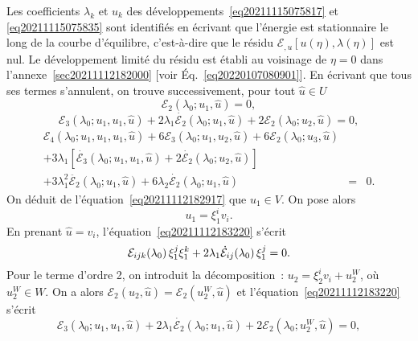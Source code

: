 \documentclass[12pt, final]{amsart}
\begin{document}
Les coefficients $\lambda_k$ et $u_k$ des
développements~\eqref{eq20211115075817} et \eqref{eq20211115075835} sont
identifiés en écrivant que l'énergie est stationnaire le long de
la courbe d'équilibre, c'est-à-dire que le résidu $\mathcal{E}_{,
u}  [u (\eta), \lambda (\eta)]$ est nul. Le développement limité du
résidu est établi au voisinage de $\eta = 0$ dans
l'annexe~\ref{sec20211112182000} [voir Éq.~\eqref{eq20220107080901}]. En
écrivant que tous ses termes s'annulent, on trouve successivement, pour
tout $\hat{u} \in U$
\begin{equation}
  \label{eq20211112182917} \mathcal{E}_2 (\lambda_0 ; u_1, \hat{u}) = 0,
\end{equation}
\begin{equation}
  \label{eq20211112183220} \mathcal{E}_3 (\lambda_0 ; u_1, u_1, \hat{u}) + 2
  \lambda_1  \dot{\mathcal{E}_2} (\lambda_0 ; u_1, \hat{u}) + 2\mathcal{E}_2
  (\lambda_0 ; u_2, \hat{u}) = 0,
\end{equation}
\begin{eqnarray}
  \mathcal{E}_4 (\lambda_0 ; u_1, u_1, u_1, \hat{u}) + 6\mathcal{E}_3
  (\lambda_0 ; u_1, u_2, \hat{u}) + 6\mathcal{E}_2 (\lambda_0 ; u_3, \hat{u})
  &  &  \nonumber\\
  + 3 \lambda_1  [\dot{\mathcal{E}_3} (\lambda_0 ; u_1, u_1, \hat{u}) + 2
  \dot{\mathcal{E}_2} (\lambda_0 ; u_2, \hat{u})] &  &  \nonumber\\
  + 3 \lambda_1^2  \ddot{\mathcal{E}_2} (\lambda_0 ; u_1, \hat{u}) + 6
  \lambda_2  \dot{\mathcal{E}_2} (\lambda_0 ; u_1, \hat{u}) & = & 0.
  \label{eq20220114135717}
\end{eqnarray}
On déduit de l'équation~\eqref{eq20211112182917} que $u_1 \in V$. On
pose alors
\begin{equation}
  \label{eq20220124135236} u_1 = \xi_1^i v_i .
\end{equation}
En prenant $\hat{u} = v_i$, l'équation~\eqref{eq20211112183220}
s'écrit
\begin{equation}
  \label{eq20220216140121} \mathcal{E}_{i  j  k} (\lambda_0)
  \hspace{0.17em} \xi_1^j \xi_1^k + 2 \lambda_1  \dot{\mathcal{E}}_{i
  j} (\lambda_0)  \hspace{0.17em} \xi_1^j = 0.
\end{equation}
Pour le terme d'ordre 2, on introduit la décomposition~: $u_2 = \xi_2^i
v_i + u_2^W$, où $u_2^W \in W$. On a alors $\mathcal{E}_2 (u_2, \hat{u})
=\mathcal{E}_2 (u_2^W, \hat{u})$ et l'équation~\eqref{eq20211112183220}
s'écrit
\begin{equation}
  \mathcal{E}_3 (\lambda_0 ; u_1, u_1, \hat{u}) + 2 \lambda_1
  \dot{\mathcal{E}_2} (\lambda_0 ; u_1, \hat{u}) + 2\mathcal{E}_2 (\lambda_0 ;
  u_2^W, \hat{u}) = 0,
\end{equation}
\end{document}
